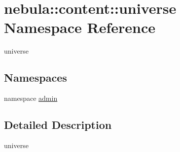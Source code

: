\hypertarget{namespacenebula_1_1content_1_1universe}{
\section{nebula::content::universe Namespace Reference}
\label{namespacenebula_1_1content_1_1universe}
}


universe  
\subsection*{Namespaces}
\begin{DoxyCompactItemize}
\item 
namespace \hyperlink{namespacenebula_1_1content_1_1universe_1_1admin}{admin}
\end{DoxyCompactItemize}


\subsection{Detailed Description}
universe 